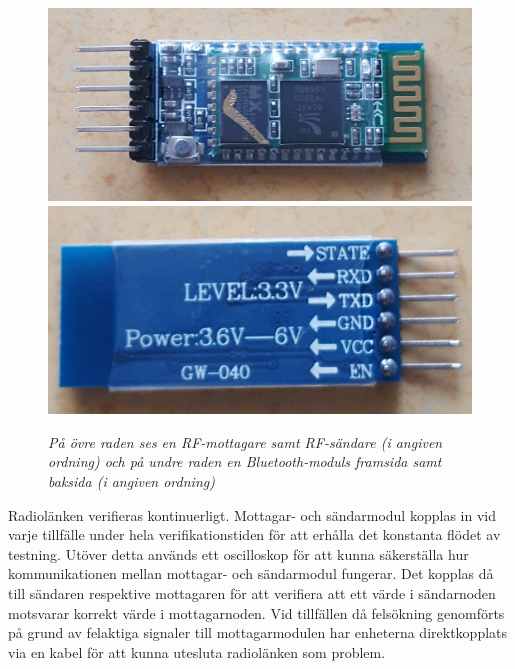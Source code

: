 \documentclass[a4paper]{article}
\begin{document}
\begin{figure}[H]
\includegraphics[scale=0.07]{BluetoothFront.jpg}
\includegraphics[scale=0.078]{BluetoothBack.jpg}

\caption{\it På övre raden ses en RF-mottagare samt RF-sändare (i angiven ordning) och på undre raden en Bluetooth-moduls framsida samt baksida (i angiven ordning)}
\end{figure} 




\vspace{5mm} \noindent
Radiolänken verifieras kontinuerligt. Mottagar- och sändarmodul kopplas in vid varje tillfälle under hela verifikationstiden för att erhålla det konstanta flödet av testning. Utöver detta används ett oscilloskop för att kunna säkerställa hur kommunikationen mellan mottagar- och sändarmodul fungerar. Det kopplas då till sändaren respektive mottagaren för att verifiera att ett värde i sändarnoden motsvarar korrekt värde i mottagarnoden. Vid tillfällen då felsökning genomförts på grund av felaktiga signaler till mottagarmodulen har enheterna direktkopplats via en kabel för att kunna utesluta radiolänken som problem.
\end{document}
